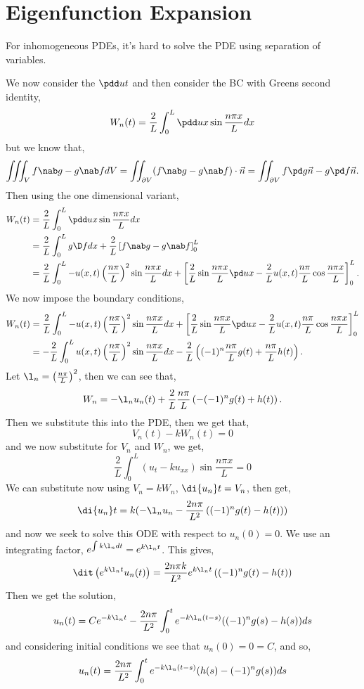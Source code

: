 
\section{Eigenfunction Expansion}
For inhomogeneous PDEs, it's hard to solve the PDE using separation of variables.

We now consider the $\pdd u t$ and then consider the BC with Greens second identity,
$$ W_n(t) = \frac{2}{L}\int_0^L \pdd u x \sin \frac{n\pi x}{L}dx $$
but we know that,
$$ \iiint_V f\nab g - g\nab f dV = \iint_{\partial V} (f\nab g - g\nab f) \cdot \vec n = \iint_{\partial V} f \pd g {\vec n} - g\pd f {\vec n}.$$
Then using the one dimensional variant,
\begin{align*}
  W_n(t) &= \frac{2}{L}\int_0^L \pdd u x \sin \frac{n\pi x}{L}dx \\
  &= \frac{2}{L}\int_0^L g\D f dx + \frac{2}{L}\left[ f\nab g - g\nab f \right]_0^L \\
  &= \frac{2}{L}\int_0^L -u(x, t)\left( \frac{n\pi}{L}\right)^2 \sin \frac{n\pi x}{L}dx + \left[\frac{2}{L}\sin \frac{n\pi x}{L}\pd u x - \frac{2}{L}u(x, t)\frac{n\pi}{L}\cos \frac{n\pi x}{L}\right]_0^L.
\end{align*}
\noindent
We now impose the boundary conditions,
\begin{align*}
  W_n(t) &= \frac{2}{L}\int_0^L -u(x, t)\left( \frac{n\pi}{L}\right)^2 \sin \frac{n\pi x}{L}dx + \left[\frac{2}{L}\sin \frac{n\pi x}{L}\pd u x - \frac{2}{L}u(x, t)\frac{n\pi}{L}\cos \frac{n\pi x}{L}\right]_0^L \\
  &= -\frac{2}{L}\int_0^L u(x, t)\left( \frac{n\pi}{L}\right)^2 \sin \frac{n\pi x}{L}dx - \frac{2}{L}\left((-1)^n \frac{n\pi}{L} g(t) + \frac{n\pi}{L}h(t) \right).
\end{align*}
Let $\l_n = \left( \frac{n\pi}{L} \right)^2$, then we can see that,
$$ W_n = - \l_n u_n(t) + \frac{2}{L}\frac{n\pi}{L}\left( -(-1)^n g(t) + h(t) \right). $$
Then we substitute this into the PDE, then we get that,
$$ V_n(t) - kW_n(t) = 0 $$
and we now substitute for $V_n$ and $W_n$, we get,
$$ \frac{2}{L}\int_0^L (u_t - ku_{xx})\sin \frac{n\pi x}{L} = 0 $$
We can substitute now using $V_n = kW_n$, $\di {u_n} t = V_n$, then get,
$$ \di {u_n} t = k(-\l_n u_n - \frac{2n\pi}{L^2}\left( (-1)^n g(t) - h(t) \right)) $$
and now we seek to solve this ODE with respect to $u_n(0) = 0$. We use an integrating factor, $e^{\int k\l_n dt} = e^{k\l_n t}$. This gives,
$$ \dit \left( e^{k\l_n t}u_n(t) \right) = \frac{2n\pi k}{L^2}e^{k\l_n t}\left( (-1)^n g(t) - h(t) \right) $$
Then we get the solution,
$$ u_n(t) = Ce^{-k\l_n t} - \frac{2n\pi}{L^2}\int_0^t e^{-k\l_n (t - s)} ((-1)^n g(s) - h(s)) ds $$
and considering initial conditions we see that $u_n(0) = 0 = C$, and so,
$$ u_n(t) = \frac{2n\pi}{L^2}\int_0^t e^{-k\l_n (t - s)} (h(s) - (-1)^n g(s)) ds $$

